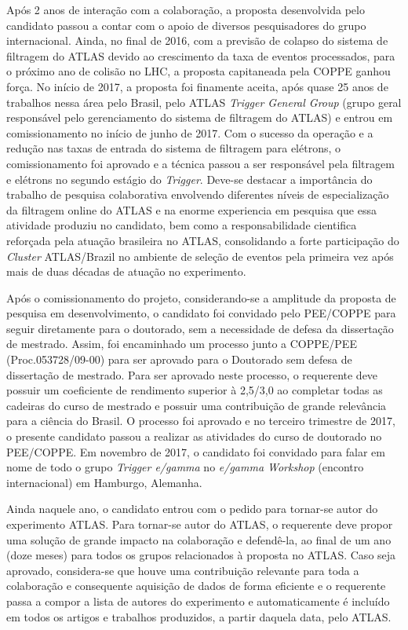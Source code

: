 Após 2 anos de interação com a colaboração, a proposta desenvolvida pelo candidato passou 
a contar com o apoio de diversos pesquisadores do grupo internacional. Ainda, no final de 
2016, com a previsão de colapso do sistema de filtragem do ATLAS devido ao crescimento da 
taxa de eventos processados, para o próximo ano de colisão no LHC, a proposta capitaneada 
pela COPPE ganhou força. No início de 2017, a proposta foi finamente aceita, após quase 
25 anos de trabalhos nessa área pelo Brasil, pelo ATLAS \emph{Trigger General Group} (grupo geral responsável 
pelo gerenciamento do sistema de filtragem do ATLAS) e entrou em comissionamento no início de 
junho de 2017. Com o sucesso da operação e a redução nas taxas de entrada do sistema de 
filtragem para elétrons, o comissionamento foi aprovado e a técnica passou a ser responsável 
pela filtragem e elétrons no segundo estágio do \emph{Trigger}. Deve-se destacar a importância do 
trabalho de pesquisa colaborativa envolvendo diferentes níveis de especialização da filtragem 
online do ATLAS e na enorme experiencia em pesquisa que essa atividade produziu no 
candidato, bem como a responsabilidade cientifica reforçada pela atuação brasileira no 
ATLAS, consolidando a forte participação do \emph{Cluster} ATLAS/Brazil no ambiente de seleção 
de eventos pela primeira vez após mais de duas décadas de atuação no experimento.



Após o comissionamento do projeto, considerando-se a amplitude da proposta de pesquisa em 
desenvolvimento, o candidato foi convidado pelo PEE/COPPE para seguir diretamente para o 
doutorado, sem a necessidade de defesa da dissertação de mestrado. Assim, foi encaminhado 
um processo junto a COPPE/PEE (Proc.053728/09-00) para ser aprovado para o Doutorado sem 
defesa de dissertação de mestrado. Para ser aprovado neste processo, o requerente deve 
possuir um coeficiente de rendimento superior à 2,5/3,0 ao completar todas as cadeiras do 
curso de mestrado e possuir uma contribuição de grande relevância para a ciência do Brasil. 
O processo foi aprovado e no terceiro trimestre de 2017, o presente candidato passou a realizar 
as atividades do curso de doutorado no PEE/COPPE. Em novembro de 2017, o candidato foi convidado 
para falar em nome de todo o grupo \emph{Trigger e/gamma} no \emph{e/gamma Workshop} 
(encontro internacional) em Hamburgo, Alemanha.



Ainda naquele ano, o candidato entrou com o pedido para tornar-se autor do experimento ATLAS. 
Para tornar-se autor do ATLAS, o requerente deve propor uma solução de grande impacto na 
colaboração e defendê-la, ao final de um ano (doze meses) para todos os grupos relacionados 
à proposta no ATLAS.  Caso seja aprovado, considera-se que houve uma contribuição relevante 
para toda a colaboração e consequente aquisição de dados de forma eficiente e o requerente 
passa a compor a lista de autores do experimento e automaticamente é incluído em todos os 
artigos e trabalhos produzidos, a partir daquela data, pelo ATLAS. 



